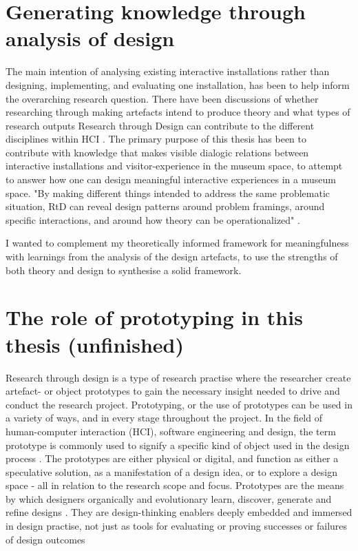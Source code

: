 \section{Generating knowledge through analysis of design}
The main intention of analysing existing interactive installations rather than designing, implementing, and evaluating one installation, has been to help inform the overarching research question. There have been discussions of whether researching through making artefacts intend to produce theory and what types of research outputs Research through Design can contribute to the different disciplines within HCI \autocite[p. 177]{zimmerman_research_2014}. The primary purpose of this thesis has been to contribute with knowledge that makes visible dialogic relations between interactive installations and visitor-experience in the museum space, to attempt to answer how one can design meaningful interactive experiences in a museum space. "By making different things intended to address the same problematic situation, RtD can reveal design patterns \autocite{Alexander_book} around problem framings, around specific interactions, and around how theory can be operationalized" \autocite[p. 178]{zimmerman_research_2014}.

I wanted to complement my theoretically informed framework for meaningfulness with learnings from the analysis of the design artefacts, to use the strengths of both theory and design to synthesise a solid framework.

\section{The role of prototyping in this thesis (unfinished)}

Research through design is a type of research practise where the researcher create artefact- or object prototypes to gain the necessary insight needed to drive and conduct the research project. Prototyping, or the use of prototypes can be used in a variety of ways, and in every stage throughout the project. In the field of human-computer interaction (HCI), software engineering and design, the term prototype is commonly used to signify a specific kind of object used in the design process \autocite[p. 2]{lim_anatomy_2008}. The prototypes are either physical or digital, and function as either a speculative solution, as a manifestation of a design idea, or to explore a design space - all in relation to the research scope and focus. Prototypes are the means by which designers organically and evolutionary learn, discover, generate and refine designs \autocite[p. 2]{lim_anatomy_2008}. They are design-thinking enablers deeply embedded and immersed in design practise, not just as tools for evaluating or proving successes or failures of design outcomes \autocite[p. 2]{lim_anatomy_2008}


